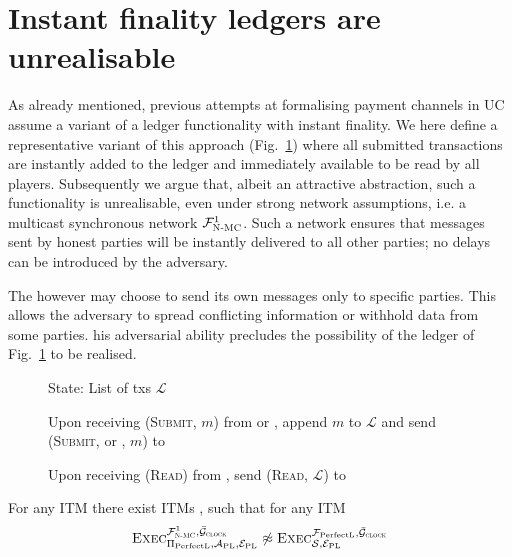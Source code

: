 \section{Instant finality ledgers are unrealisable}
\label{sec:perfect-ledger}
  As already mentioned, previous attempts at formalising payment channels in
  UC~\cite{DBLP:conf/ccs/DziembowskiFH18,Malavolta:2017:CPP:3133956.3134096,sprites,perun}
  assume a variant of a ledger functionality with instant finality. We here
  define a representative variant of this approach \perfectledger{}
  (Fig.~\ref{fig:perfectledger:func}) where all submitted transactions are
  instantly added to the ledger and immediately available to be read by all
  players. Subsequently we argue that, albeit an attractive abstraction, such a
  functionality is unrealisable, even under strong network assumptions, i.e. a
  multicast synchronous network $\mathcal{F}_{\textsc{N-MC}}^1$. Such a network ensures that
  messages sent by honest parties will be instantly delivered to all other
  parties; no delays can be introduced by the adversary. 

  The  however may choose to send its own messages only to
  specific parties. This allows the adversary to spread conflicting information
  or withhold data from some parties. his adversarial ability
  precludes the possibility of the ledger of Fig.~\ref{fig:perfectledger:func}
  to be realised.

  \begin{figure}[H]
    \begin{systembox}{\perfectledger}
      \begin{algorithmic}[1]
        \State State: List of txs $\mathcal{L}$
        \Statex

        \State Upon receiving (\textsc{Submit}, $m$) from \alice{} or
        \adversary, append $m$ to $\mathcal{L}$ and send (\textsc{Submit},
        \alice{} or \adversary, $m$) to \adversary
        \Statex

        \State Upon receiving (\textsc{Read}) from \alice, send (\textsc{Read},
        $\mathcal{L}$) to \alice
      \end{algorithmic}
    \end{systembox}
    \caption{}
    \label{fig:perfectledger:func}
  \end{figure}

  \begin{theorem}
    \label{theorem:perfectledger}
    For any ITM \perfectprot{} there exist ITMs \perfectenv,
    \perfectadv{} such that for any ITM \simulator
    \begin{equation*}
      \textsc{Exec}^{\FnetworkEd^1, \gFclock}_{\perfectprot,
      \redden{\perfectadv, \perfectenv}} \not\approx
      \textsc{Exec}^{\perfectledger, \gFclock}_{\simulator,
      \redden{\perfectenv}}
    \end{equation*}
  \end{theorem}

